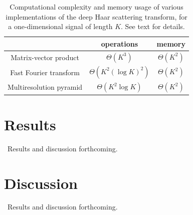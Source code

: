 \documentclass{article}
\begin{document}
\begin{table}
	\begin{center}
	\begin{tabular}{|c|cc|}
		\hline
		& operations & memory \\
		\hline
		Matrix-vector product & $\Theta(K^3)$ & $\Theta(K^2)$ \\
		Fast Fourier transform & $\Theta(K^2 (\log K)^2)$ & $\Theta(K^2)$ \\
		Multiresolution pyramid & $\Theta(K^2 \log K)$ & $\Theta(K^2)$ \\
		\hline		
	\end{tabular}
	\end{center}
	\caption{Computational complexity and memory usage of various implementations
	of the deep Haar scattering transform, for a one-dimensional signal
	of length $K$. See text for details.
	\label{table:scattering-complexities}}
\end{table}
	

\section{Results}\label{sec:results}

~Results and discussion forthcoming.~
	

\section{Discussion}\label{sec:discussion}

~Results and discussion forthcoming.~





%
%
%
%
\end{document}
